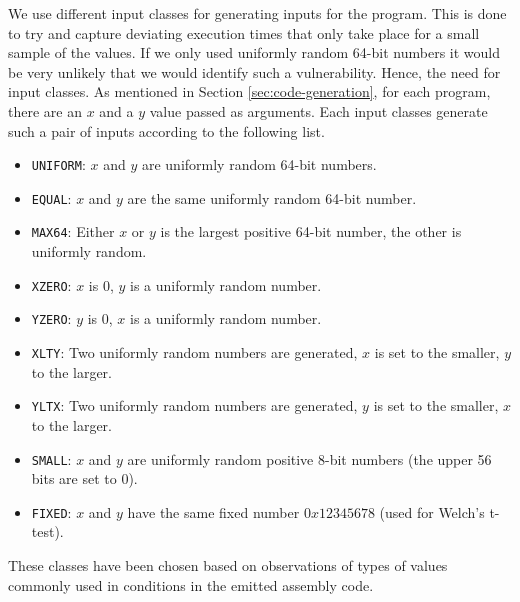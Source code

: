 We use different input classes for generating inputs for the program. 
This is done to try and capture deviating execution times that only take place for a small sample of the values.
If we only used uniformly random 64-bit numbers it would be very unlikely that we would identify such a vulnerability.
Hence, the need for input classes.
As mentioned in Section \ref{sec:code-generation}, for each program, there are an $x$ and a $y$ value passed as arguments. 
Each input classes generate such a pair of inputs according to the following list.
\begin{itemize}
    \setlength\itemsep{-0.6em}
    \item \texttt{UNIFORM}: $x$ and $y$ are uniformly random 64-bit numbers.
    \item \texttt{EQUAL}:  $x$ and $y$ are the same uniformly random 64-bit number.
    \item \texttt{MAX64}: Either $x$ or $y$ is the largest positive 64-bit number, the other is uniformly random.
    \item \texttt{XZERO}: $x$ is 0, $y$ is a uniformly random number.
    \item \texttt{YZERO}: $y$ is 0, $x$ is a uniformly random number.
    \item \texttt{XLTY}: Two uniformly random numbers are generated, $x$ is set to the smaller, $y$ to the larger.
    \item \texttt{YLTX}: Two uniformly random numbers are generated, $y$ is set to the smaller, $x$ to the larger.
    \item \texttt{SMALL}: $x$ and $y$ are uniformly random positive 8-bit numbers (the upper 56 bits are set to 0).
    \item \texttt{FIXED}: $x$ and $y$ have the same fixed number $0x12345678$ (used for Welch's t-test).
\end{itemize}
These classes have been chosen based on observations of types of values commonly used in conditions in the emitted assembly code.

